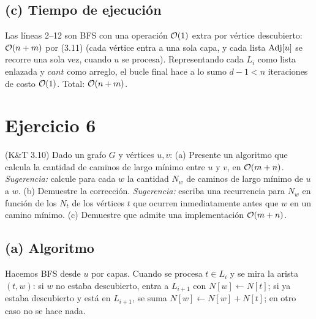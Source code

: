 \subsection*{(c) Tiempo de ejecución}
Las líneas 2--12 son BFS con una operación $\mathcal{O}(1)$ extra por vértice descubierto: $\mathcal{O}(n+m)$ por
(3.11) (cada vértice entra a una sola capa, y cada lista $\mathrm{Adj}[u]$ se recorre una sola vez, cuando $u$
se procesa). Representando cada $L_i$ como lista enlazada y $cant$ como arreglo, el bucle final
hace a lo sumo $d-1<n$ iteraciones de costo $\mathcal{O}(1)$. Total: $\mathcal{O}(n+m)$.

\section{Ejercicio 6}
\begin{enunciado}
(K\&T 3.10) Dado un grafo $G$ y vértices $u,v$:
(a) Presente un algoritmo que calcula la cantidad de caminos de largo mínimo entre $u$ y $v$, en
$\mathcal{O}(m+n)$. \emph{Sugerencia:} calcule para cada $w$ la cantidad $N_w$ de caminos de largo mínimo de
$u$ a $w$.
(b) Demuestre la corrección. \emph{Sugerencia:} escriba una recurrencia para $N_w$ en función de los
$N_t$ de los vértices $t$ que ocurren inmediatamente antes que $w$ en un camino mínimo.
(c) Demuestre que admite una implementación $\mathcal{O}(m+n)$.
\end{enunciado}

\subsection*{(a) Algoritmo}
Hacemos BFS desde $u$ por capas. Cuando se procesa $t\in L_i$ y se mira la arista $(t,w)$: si $w$ no
estaba descubierto, entra a $L_{i+1}$ con $N[w]\gets N[t]$; si ya estaba descubierto y está en
$L_{i+1}$, se suma $N[w]\gets N[w]+N[t]$; en otro caso no se hace nada.

